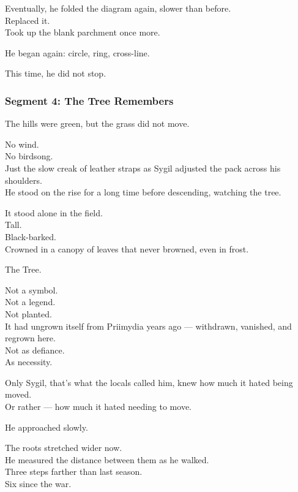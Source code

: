 \documentclass[9pt]{article}
\begin{document}
\vspace{1em}

Eventually, he folded the diagram again, slower than before.\\
Replaced it.\\
Took up the blank parchment once more.

He began again: circle, ring, cross-line.

\vspace{1em}

This time, he did not stop.

\newpage

\subsubsection*{Segment 4: The Tree Remembers}

The hills were green, but the grass did not move.

No wind.\\
No birdsong.\\
Just the slow creak of leather straps as Sygil adjusted the pack across his shoulders.\\
He stood on the rise for a long time before descending, watching the tree.

It stood alone in the field.\\
Tall.\\
Black-barked.\\
Crowned in a canopy of leaves that never browned, even in frost.

The Tree.

Not a symbol.\\
Not a legend.\\
Not planted.\\
It had ungrown itself from Priimydia years ago — withdrawn, vanished, and regrown here.\\
Not as defiance.\\
As necessity.

Only Sygil, that’s what the locals called him, knew how much it hated being moved.\\
Or rather — how much it hated needing to move.

\vspace{1em}

He approached slowly.

The roots stretched wider now.\\
He measured the distance between them as he walked.\\
Three steps farther than last season.\\
Six since the war.
\end{document}
